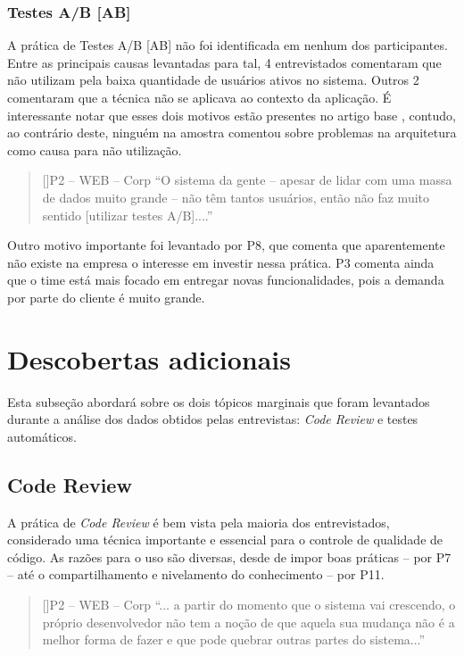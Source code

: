 \subsubsection{Testes A/B [AB]}

A prática de Testes A/B [AB] não foi identificada em nenhum dos participantes. Entre as principais causas levantadas para tal, 4 entrevistados comentaram que não utilizam pela baixa quantidade de usuários ativos no sistema. Outros 2 comentaram que a técnica não se aplicava ao contexto da aplicação. É interessante notar que esses dois motivos estão presentes no artigo base \cite{empiricalStudy2016}, contudo, ao contrário deste, ninguém na amostra comentou sobre problemas na arquitetura como causa para não utilização.


\begin{quotation}[]{P2 -- WEB -- Corp}
    ``O sistema da gente -- apesar de lidar com uma massa de dados muito grande -- não têm tantos usuários, então não faz muito sentido [utilizar testes A/B]....''
\end{quotation}

Outro motivo importante foi levantado por P8, que comenta que aparentemente não existe na empresa o interesse em investir nessa prática. P3 comenta ainda que o time está mais focado em entregar novas funcionalidades, pois a demanda por parte do cliente é muito grande.

\section{Descobertas adicionais}

Esta subseção abordará sobre os dois tópicos marginais que foram levantados durante a análise dos dados obtidos pelas entrevistas: \emph{Code Review} e testes automáticos.

\subsection{Code Review}

A prática de \emph{Code Review} \cite{codeReview} é bem vista pela maioria dos entrevistados, considerado uma técnica importante e essencial para o controle de qualidade de código. As razões para o uso são diversas, desde de impor boas práticas -- por P7 -- até o compartilhamento e nivelamento do conhecimento -- por P11.

\begin{quotation}[]{P2 -- WEB -- Corp}
    ``... a partir do momento que o sistema vai crescendo, o próprio desenvolvedor não tem a noção de que aquela sua mudança não é a melhor forma de fazer e que pode quebrar outras partes do sistema...''
\end{quotation}

